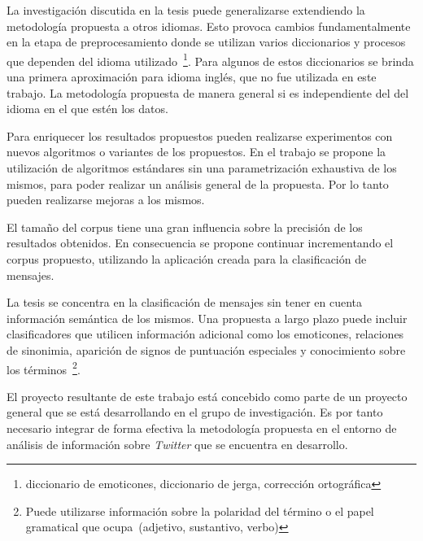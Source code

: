 \begin{recomendations}
La investigación discutida en la tesis puede generalizarse
extendiendo la metodología propuesta a otros idiomas. Esto 
provoca cambios fundamentalmente en la etapa de preprocesamiento
donde se utilizan varios diccionarios y procesos que dependen del idioma 
utilizado~\footnote{diccionario de emoticones, diccionario de jerga, corrección 
ortográfica}. Para algunos de estos diccionarios se brinda una primera 
aproximación para idioma inglés, que no fue utilizada en este trabajo.
La metodología propuesta de manera general si es independiente del 
del idioma en el que estén los datos.

Para enriquecer los resultados propuestos pueden realizarse 
experimentos con nuevos algoritmos o variantes de los 
propuestos. En el trabajo se propone la utilización de algoritmos
estándares sin una parametrización exhaustiva de los mismos,
para poder realizar un análisis general de la propuesta. Por lo tanto 
pueden realizarse mejoras a los mismos.

El tamaño del corpus tiene una gran influencia sobre la precisión
de los resultados obtenidos. En consecuencia se propone continuar incrementando 
el corpus propuesto, utilizando la aplicación creada para la 
clasificación de mensajes. 

La tesis se concentra en la clasificación de mensajes sin tener en cuenta 
información semántica de los mismos. Una propuesta a largo 
plazo puede incluir clasificadores que utilicen información adicional
como los emoticones, relaciones de sinonimia, aparición de signos de puntuación 
especiales y conocimiento sobre los términos~\footnote{Puede utilizarse información
sobre la polaridad del término o el papel gramatical que ocupa~(adjetivo, sustantivo, verbo)}.

El proyecto resultante de este trabajo está concebido
como parte de un proyecto general que se está desarrollando en el
grupo de investigación. Es por tanto necesario integrar
de forma efectiva la metodología propuesta en el
entorno de análisis de información sobre
\emph{Twitter} que se encuentra en desarrollo.
\end{recomendations}